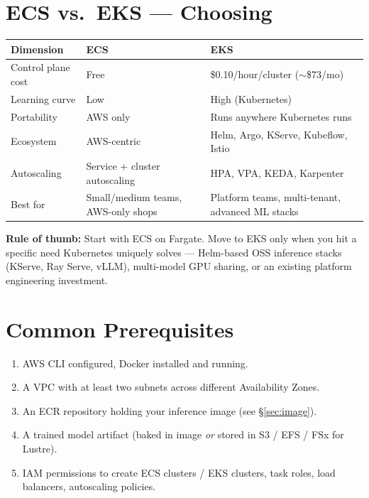 \documentclass[11pt,a4paper]{article}
\begin{document}
\section{ECS vs.\ EKS --- Choosing}

\begin{longtable}{p{4cm} p{5cm} p{5.5cm}}
\toprule
\textbf{Dimension} & \textbf{ECS} & \textbf{EKS} \\
\midrule
Control plane cost & Free & \$0.10/hour/cluster ($\sim$\$73/mo) \\
\addlinespace
Learning curve & Low & High (Kubernetes) \\
\addlinespace
Portability & AWS only & Runs anywhere Kubernetes runs \\
\addlinespace
Ecosystem & AWS-centric & Helm, Argo, KServe, Kubeflow, Istio \\
\addlinespace
Autoscaling & Service + cluster autoscaling & HPA, VPA, KEDA, Karpenter \\
\addlinespace
Best for & Small/medium teams, AWS-only shops & Platform teams, multi-tenant, advanced ML stacks \\
\bottomrule
\end{longtable}

\begin{tipbox}
\textbf{Rule of thumb:} Start with ECS on Fargate. Move to EKS only when you
hit a specific need Kubernetes uniquely solves --- Helm-based OSS inference
stacks (KServe, Ray Serve, vLLM), multi-model GPU sharing, or an existing
platform engineering investment.
\end{tipbox}

\section{Common Prerequisites}

\begin{enumerate}[leftmargin=*]
    \item AWS CLI configured, Docker installed and running.
    \item A VPC with at least two subnets across different Availability Zones.
    \item An ECR repository holding your inference image (see
          \S\ref{sec:image}).
    \item A trained model artifact (baked in image \emph{or} stored in S3 / EFS /
          FSx for Lustre).
    \item IAM permissions to create ECS clusters / EKS clusters, task roles,
          load balancers, autoscaling policies.
\end{enumerate}
\end{document}

